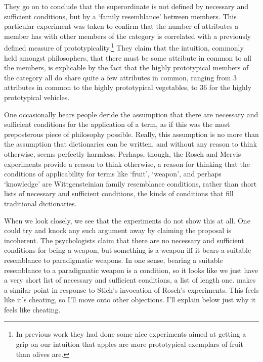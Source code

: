 \noindent They go on to conclude that the superordinate is not defined by necessary and sufficient conditions, but by a `family resemblance' between members. This particular experiment was taken to confirm that the number of attributes a member has with other members of the category is correlated with a previously defined measure of prototypicality.\footnote{In previous work they had done some nice experiments aimed at getting a grip on our intuition that apples are more prototypical exemplars of fruit than olives are.}  They claim that the intuition, commonly held amongst philosophers, that there must be some attribute in common to all the members, is explicable by the fact that the highly prototypical members of the category all do share quite a few attributes in common, ranging from 3 attributes in common to the highly prototypical vegetables, to 36 for the highly prototypical vehicles.

One occasionally hears people deride the assumption that there are necessary and sufficient conditions for the application of a term, as if this was the most preposterous piece of philosophy possible. Really, this assumption is no more than the assumption that dictionaries can be written, and without any reason to think otherwise, seems perfectly harmless. Perhaps, though, the Rosch and Mervis experiments provide a reason to think otherwise, a reason for thinking that the conditions of applicability for terms like `fruit', `weapon', and perhaps `knowledge' are Wittgensteinian family resemblance conditions, rather than short lists of necessary and sufficient conditions, the kinds of conditions that fill traditional dictionaries.

When we look closely, we see that the experiments do not show this at all. One could try and knock any such argument away by claiming the proposal is incoherent. The psychologists claim that there are no necessary and sufficient conditions for being a weapon, but something is a weapon iff it bears a suitable resemblance to paradigmatic weapons. In one sense, bearing a suitable resemblance to a paradigmatic weapon is a condition, so it looks like we just have a very short list of necessary and sufficient conditions, a list of length one. \cite[61]{Jackson1998} makes a similar point in response to Stich's invocation of Rosch's experiments. This feels like it's cheating, so I'll move onto other objections. I'll explain below just why it feels like cheating.

